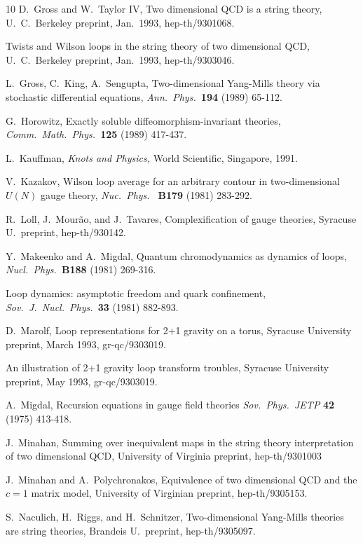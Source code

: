 \begin{thebibliography} {10}
 D.\ Gross and W.\ Taylor IV, Two dimensional QCD is a
string theory, U.\ C.\ Berkeley preprint, Jan.\ 1993, hep-th/9301068.

Twists and Wilson loops in
the string theory of two dimensional QCD, U.\ C.\ Berkeley preprint,
Jan.\ 1993, hep-th/9303046.

 L.\ Gross, C.\ King, A.\ Sengupta, Two-dimensional
Yang-Mills theory via stochastic differential equations, {\sl Ann.\
Phys.\ }{\bf 194} (1989) 65-112.

 G.\ Horowitz, Exactly soluble diffeomorphism-invariant
theories, {\sl Comm.\ Math.\ Phys.\ }{\bf 125} (1989) 417-437.

  L.\ Kauffman, {\sl Knots and Physics,} World
Scientific, Singapore, 1991.

 V.\ Kazakov, Wilson loop average for an arbitrary
contour in two-dimensional $U(N)$ gauge theory, {\sl Nuc.\ Phys.\ }{\bf
B179} (1981) 283-292.

 R.\ Loll, J.\ Mour\~ao, and J.\ Tavares,
Complexification of gauge theories, Syracuse U.\ preprint,
hep-th/930142.

 Y.\ Makeenko and A.\ Migdal, Quantum chromodynamics as
dynamics of loops, {\sl Nucl.\ Phys.\ }{\bf B188} (1981) 269-316.

Loop dynamics: asymptotic
freedom and quark confinement, {\sl Sov.\ J.\ Nucl.\ Phys.\ }{\bf 33} (1981)
882-893.

 D.\ Marolf, Loop representations for 2+1 gravity
 on a torus, Syracuse University preprint, March 1993, gr-qc/9303019.

An illustration of 2+1 gravity loop transform troubles,
Syracuse University preprint, May 1993, gr-qc/9303019.

  A.\  Migdal, Recursion equations in gauge field
theories {\sl Sov.\ Phys.\  JETP} {\bf 42} (1975) 413-418.

 J.\ Minahan, Summing over inequivalent maps in the
string theory interpretation of two dimensional QCD, University of
Virginia preprint, hep-th/9301003

 J.\ Minahan and A.\ Polychronakos, Equivalence of two
dimensional QCD and the $c = 1$ matrix model, University of Virginian
preprint, hep-th/9305153.

 S.\ Naculich, H.\ Riggs, and H.\ Schnitzer,
Two-dimensional Yang-Mills theories are string theories, Brandeis U.\
preprint, hep-th/9305097.


\end{thebibliography}
